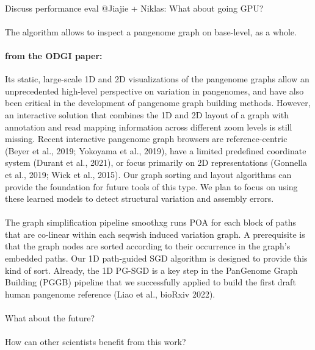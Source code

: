 \documentclass[11pt,hidelinks]{article}
\begin{document}
\paragraph{}
Discuss performance eval
@Jiajie + Niklas: What about going GPU?
\paragraph{}
The algorithm allows to inspect a pangenome graph on base-level, as a whole.
\paragraph{from the ODGI paper:}
Its static, large-scale 1D and 2D visualizations of the pangenome graphs allow an unprecedented high-level perspective on variation in pangenomes, and have also been critical in the development of pangenome graph building methods. However, an interactive solution that combines the 1D and 2D layout of a graph with annotation and read mapping information across different zoom levels is still missing. Recent interactive pangenome graph browsers are reference-centric (Beyer et al., 2019; Yokoyama et al., 2019), have a limited predefined coordinate system (Durant et al., 2021), or focus primarily on 2D representations (Gonnella et al., 2019; Wick et al., 2015). Our graph sorting and layout algorithms can provide the foundation for future tools of this type. We plan to focus on using these learned models to detect structural variation and assembly errors.
\paragraph{}
The graph simplification pipeline smoothxg runs POA for each block of paths that are co-linear within each seqwish induced variation graph. A prerequisite is that the graph nodes are sorted according to their occurrence in the graph's embedded paths. Our 1D path-guided SGD algorithm is designed to provide this kind of sort. Already, the 1D PG-SGD is a key step in the PanGenome Graph Building (PGGB) pipeline that we successfully applied to build the first draft human pangenome reference (Liao et al., bioRxiv 2022).
\paragraph{}
What about the future? 
\paragraph{}
How can other scientists benefit from this work?
\end{document}
